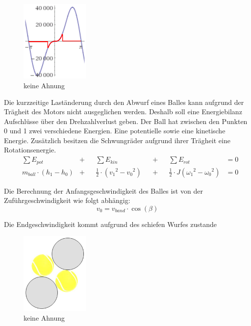 \begin{figure}[h!]
	\centering
	\includegraphics[width=0.3\textwidth]{Enddokumentation/Anhang/Bilder/WeissNicht.png}
	\caption{keine Ahnung}
	\label{fig:keineAhnung}
\end{figure}
Die kurzzeitige Laständerung durch den Abwurf eines Balles kann aufgrund der Trägheit des
Motors nicht ausgeglichen werden. Deshalb soll eine Energiebilanz Aufschlüsse über den
Drehzahlverlust geben. Der Ball hat zwischen den Punkten 0 und 1 zwei verschiedene Energien.
Eine potentielle sowie eine kinetische Energie. Zusätzlich besitzen die Schwungräder
aufgrund ihrer Trägheit eine Rotationsenergie.
\begin{align}
 	&\sum E_{pot} &+&& \sum E_{kin} &&+&& \sum E_{rot} &= 0 \\
 	& m_{ball} \cdot \left(h_1 - h_0\right) &+&&\frac{1}{2} \cdot \left( v_1{^{2}} - v_0{^{2}} \right) &&+&&\frac{1}{2} \cdot J \left( \omega_1{^{2}} - \omega_0{^{2}} \right) &= 0
\end{align}

Die Berechnung der Anfangsgeschwindigkeit des Balles ist von der Zuführgeschwindigkeit wie
folgt abhängig:
\begin{equation}
 	v_0 = v_{band} \cdot \cos(\beta)
\end{equation}

Die Endgeschwindigkeit kommt aufgrund des schiefen Wurfes zustande
\begin{figure}[h!]
	\centering
	\includegraphics[width=0.3\textwidth]{Enddokumentation/Anhang/Bilder/Ballnachfuehrung.png}
	\caption{keine Ahnung}
	\label{fig:Ballnachführung}
\end{figure}

